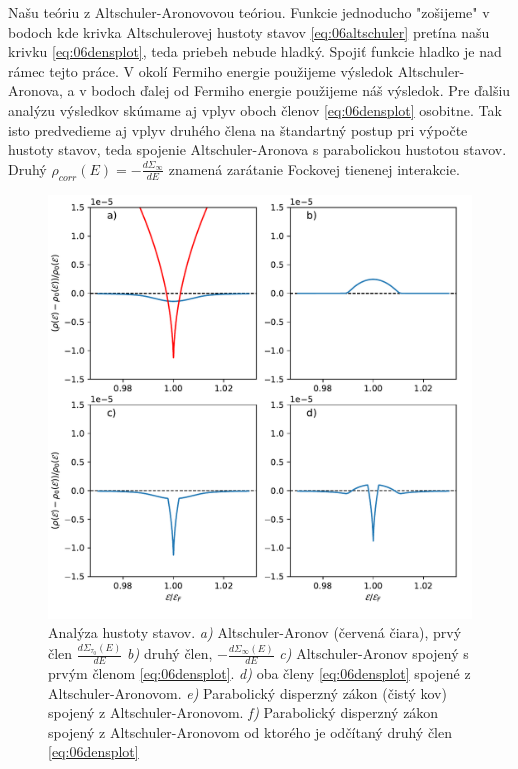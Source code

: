  Našu teóriu z Altschuler-Aronovovou teóriou. Funkcie jednoducho "zošijeme" v bodoch kde krivka Altschulerovej hustoty stavov \eqref{eq:06altschuler} pretína našu krivku \eqref{eq:06densplot}, teda priebeh nebude hladký. Spojiť funkcie hladko je nad rámec tejto práce. V okolí Fermiho energie použijeme výsledok Altschuler-Aronova, a v bodoch ďalej od Fermiho energie použijeme náš výsledok. Pre ďalšiu analýzu výsledkov skúmame aj vplyv oboch členov \eqref{eq:06densplot} osobitne. Tak isto predvedieme aj vplyv druhého člena na štandartný postup pri výpočte hustoty stavov, teda spojenie Altschuler-Aronova s parabolickou hustotou stavov. Druhý $\rho_{corr}(E)=-\frac{d\Sigma_{\infty}}{dE}$  znamená zarátanie Fockovej tienenej interakcie.
\begin{figure}[H]
\centering
\includegraphics[scale=0.8]{grafy/plot_tau_1_c_1}
\caption{Analýza hustoty stavov. {\it a)} Altschuler-Aronov (červená čiara), prvý člen $\frac{d\Sigma_{\tau_0}(E)}{dE}$ {\it b)} druhý člen, $-\frac{d\Sigma_{\infty}(E)}{dE}$  {\it c)} Altschuler-Aronov spojený s prvým členom  \eqref{eq:06densplot}. {\it d)} oba členy \eqref{eq:06densplot} spojené z Altschuler-Aronovom. {\it e)} Parabolický disperzný zákon (čistý kov) spojený z Altschuler-Aronovom. {\it f)} Parabolický disperzný zákon spojený z Altschuler-Aronovom od ktorého je odčítaný druhý člen \eqref{eq:06densplot}}
\label{fig:results}
\end{figure}

